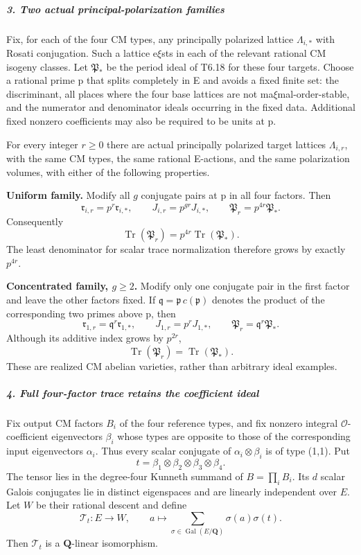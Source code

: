 \subparagraph{3. Two actual principal-polarization families}\label{two-actual-principal-polarization-families}

Fix, for each of the four CM types, any principally polarized lattice \(\Lambda_{i,*}\) with Rosati conjugation. Such a lattice e\(\xi\)sts in each of the relevant rational CM isogeny classes. Let \(\mathfrak P_*\) be the period ideal of T6.18 for these four targets. Choose a rational prime p that splits completely in E and avoids a fixed finite set: the discriminant, all places where the four base lattices are not ma\(\xi\)mal-order-stable, and the numerator and denominator ideals occurring in the fixed data. Additional fixed nonzero coefficients may also be required to be units at p.

For every integer \(r\ge0\) there are actual principally polarized target lattices \(\Lambda_{i,r}\), with the same CM types, the same rational E-actions, and the same polarization volumes, with either of the following properties.

\textbf{Uniform family.} Modify all \(g\) conjugate pairs at p in all four factors. Then \[
 \mathfrak r_{i,r}=p^r\mathfrak r_{i,*},\qquad
 J_{i,r}=p^{gr}J_{i,*},\qquad
 \mathfrak P_r=p^{4r}\mathfrak P_*.
 \tag{T19.3}
\] Consequently \[
 \operatorname{Tr}(\mathfrak P_r)
   =p^{4r}\operatorname{Tr}(\mathfrak P_*).
 \tag{T19.4}
\] The least denominator for scalar trace normalization therefore grows by exactly \(p^{4r}\).

\textbf{Concentrated family, \(g\ge2\).} Modify only one conjugate pair in the first factor and leave the other factors fixed. If \(\mathfrak q=\mathfrak p\,c(\mathfrak p)\) denotes the product of the corresponding two primes above p, then \[
 \mathfrak r_{1,r}=\mathfrak q^r\mathfrak r_{1,*},\qquad
 J_{1,r}=p^rJ_{1,*},\qquad
 \mathfrak P_r=\mathfrak q^r\mathfrak P_*.
 \tag{T19.5}
\] Although its additive index grows by \(p^{2r}\), \[
 \operatorname{Tr}(\mathfrak P_r)
    =\operatorname{Tr}(\mathfrak P_*).
 \tag{T19.6}
\] These are realized CM abelian varieties, rather than arbitrary ideal examples.

\subparagraph{4. Full four-factor trace retains the coefficient ideal}\label{full-four-factor-trace-retains-the-coefficient-ideal}

Fix output CM factors \(B_i\) of the four reference types, and fix nonzero integral \(\mathcal O\)-coefficient eigenvectors \(\beta_i\) whose types are opposite to those of the corresponding input eigenvectors \(\alpha_i\). Thus every scalar conjugate of \(\alpha_i\otimes\beta_i\) is of type (1,1). Put \[
 t=\beta_1\otimes\beta_2\otimes\beta_3\otimes\beta_4.
\] The tensor lies in the degree-four Kunneth summand of \(B=\prod_iB_i\). Its \(d\) scalar Galois conjugates lie in distinct eigenspaces and are linearly independent over \(E\). Let \(W\) be their rational descent and define \[
 \mathcal T_t:E\longrightarrow W,\qquad
 a\longmapsto\sum_{\sigma\in\operatorname{Gal}(E/\mathbf Q)}
                      \sigma(a)\sigma(t).
 \tag{T19.7}
\] Then \(\mathcal T_t\) is a \(\mathbf Q\)-linear isomorphism.

